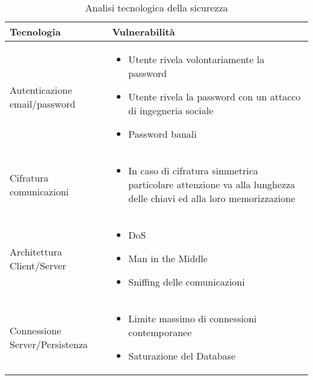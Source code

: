 \begin{table}[htbp]
    \centering
    \begin{tabular} {|P{4cm}|P{12cm}|}
        \hline
        Tecnologia                     & Vulnerabilità                                                                            \\
        \hline
        Autenticazione email/password  &
        \begin{itemize}
            \item Utente rivela volontariamente la password
            \item Utente rivela la password con un attacco di ingegneria sociale
            \item Password banali
        \end{itemize}                                                       \\
        \hline
        Cifratura comunicazioni        &
        \begin{itemize}
            \item In caso di cifratura simmetrica particolare attenzione va alla lunghezza delle chiavi ed alla loro memorizzazione
        \end{itemize} \\
        \hline
        Architettura Client/Server     &
        \begin{itemize}
            \item DoS
            \item Man in the Middle
            \item Sniffing delle comunicazioni
        \end{itemize}                                                                                       \\
        \hline
        Connessione Server/Persistenza & \begin{itemize}
                                             \item Limite massimo di connessioni contemporanee
                                             \item Saturazione del Database
                                         \end{itemize}                                         \\
        \hline
    \end{tabular}
    \caption{Analisi tecnologica della sicurezza}
    \label{<label>}
\end{table}

